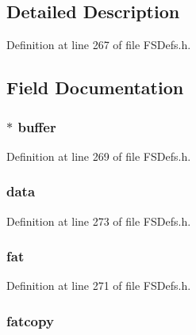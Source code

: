 \subsection{Detailed Description}


Definition at line 267 of file F\+S\+Defs.\+h.



\subsection{Field Documentation}
\hypertarget{struct_d_i_s_k_a4ec488d25cd057a45ada6fd7c83de21b}{}
\subsubsection[{buffer}]{$\ast$ buffer}\label{struct_d_i_s_k_a4ec488d25cd057a45ada6fd7c83de21b}


Definition at line 269 of file F\+S\+Defs.\+h.

\hypertarget{struct_d_i_s_k_a93725455c265ad9e4e156050f329ee97}{}
\subsubsection[{data}]{ data}\label{struct_d_i_s_k_a93725455c265ad9e4e156050f329ee97}


Definition at line 273 of file F\+S\+Defs.\+h.

\hypertarget{struct_d_i_s_k_a7b898a474462813d546af9cf8392199e}{}
\subsubsection[{fat}]{ fat}\label{struct_d_i_s_k_a7b898a474462813d546af9cf8392199e}


Definition at line 271 of file F\+S\+Defs.\+h.

\hypertarget{struct_d_i_s_k_ac037845172a33a3fc49137ebaae57c4e}{}
\subsubsection[{fatcopy}]{ fatcopy}\label{struct_d_i_s_k_ac037845172a33a3fc49137ebaae57c4e}


